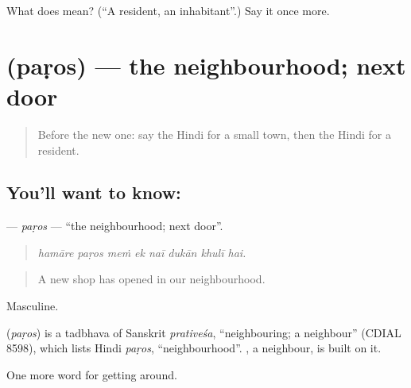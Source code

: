 \begin{tcolorbox}[breakable,colback=teal!4,colframe=teal!35!black,title={Before you move on}]
What does  mean? (\textquotedblleft{}A resident, an inhabitant\textquotedblright{}.) Say it once more.
\end{tcolorbox}
\section[\texorpdfstring{\hi{पड़ोस} (paṛos)}{पड़ोस (paṛos)}]{ (paṛos) — the neighbourhood; next door}

\label{lesson:HI-C421-paros}



\begin{quote}
Before the new one: say the Hindi for a small town, then the Hindi for a resident.
\end{quote}

\subsection*{You'll want to know: }
\textbf{} — \emph{paṛos} — \textquotedblleft{}the neighbourhood; next door\textquotedblright{}.

\begin{quote}
       
\end{quote}

\begin{quote}
\emph{hamāre paṛos meṁ ek naī dukān khulī hai.}
\end{quote}

\begin{quote}
A new shop has opened in our neighbourhood.
\end{quote}

Masculine.

\begin{cousinweb}
\textbf{} (\emph{paṛos}) is a tadbhava of Sanskrit \emph{prativeśa}, \textquotedblleft{}neighbouring; a neighbour\textquotedblright{} (CDIAL 8598), which lists Hindi \emph{paṛos}, \textquotedblleft{}neighbourhood\textquotedblright{}. , a neighbour, is built on it.
\end{cousinweb}

\begin{grammarlens}[title={What you've built}]
One more word for getting around.
\end{grammarlens}

